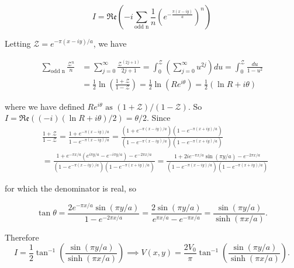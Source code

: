 \documentclass[english,a4paper,12pt]{report}
\begin{document}
{\begin{equation}
    I = \mathfrak{Re} \left(-i\sum_{\text{odd n}}^{} \frac{1}{n} \left(e^{-\frac{\pi (x-iy)}{a} }\right)^{n}\right) 
\end{equation}

Letting \( \mathcal{Z} = e^{-\pi (x-iy)/a }  \), we have

\begin{equation}
    \begin{aligned}
        \sum_{\text{odd n}}^{} \frac{\mathcal{Z} ^{n} }{n} &= \sum_{j=0}^{\infty} \frac{\mathcal{Z} ^{(2j+1)} }{2j+1} = \int_{0}^{\mathcal{Z} } \left(\sum_{j=0}^{\infty} u^{2j} \right)du = \int_{0}^{\mathcal{Z} } \frac{du}{1-u^2} \\
        &= \frac{1}{2} \ln (\frac{1+\mathcal{Z} }{1-\mathcal{Z} } ) = \frac{1}{2}  \ln (R e^{i\theta } ) = \frac{1}{2} (\ln R + i\theta )
    \end{aligned}
\end{equation}

where we have defined \(R e^{i\theta } \text{ as } (1+\mathcal{Z}) / (1-\mathcal{Z}) \). So \( I =  \mathfrak{Re}  ((-i) (\ln R + i\theta ) /2) = \theta /2 \). Since 
\begin{equation}
    \begin{aligned}
        &\frac{1+\mathcal{Z}}{1-\mathcal{Z}}=\frac{1+e^{-\pi(x-i y) / a}}{1-e^{-\pi(x-i y) / a}}=\frac{\left(1+e^{-\pi(x-i y) / a}\right)\left(1-e^{-\pi(x+i y) / a}\right)}{\left(1-e^{-\pi(x-i y) / a}\right)\left(1-e^{-\pi(x+i y) / a}\right)} \\
        & =\frac{1+e^{-\pi x / a}\left(e^{i \pi y / a}-e^{-i \pi y / a}\right)-e^{-2 \pi x / a}}{\left(1-e^{-\pi(x-i y) / a}\right)\left(1-e^{-\pi(x+i y) / a}\right)}=\frac{1+2 i e^{-\pi x / a} \sin (\pi y / a)-e^{-2 \pi x / a}}{\left(1-e^{-\pi(x-i y) / a}\right)\left(1-e^{-\pi(x+i y) / a}\right)}
    \end{aligned}
\end{equation}

for which the denominator is real, so

\begin{equation}
    \tan \theta=\frac{2 e^{-\pi x / a} \sin (\pi y / a)}{1-e^{-2 \pi x / a}}=\frac{2 \sin (\pi y / a)}{e^{\pi x / a}-e^{-\pi x / a}}=\frac{\sin (\pi y / a)}{\sinh (\pi x / a)}. 
\end{equation}


Therefore 
\begin{equation}
    I=\frac{1}{2} \tan ^{-1}\left(\frac{\sin (\pi y / a)}{\sinh (\pi x / a)}\right) \implies  V(x, y)=\frac{2 V_0}{\pi} \tan ^{-1}\left(\frac{\sin (\pi y / a)}{\sinh (\pi x / a)}\right) .
\end{equation}}
\end{document}
